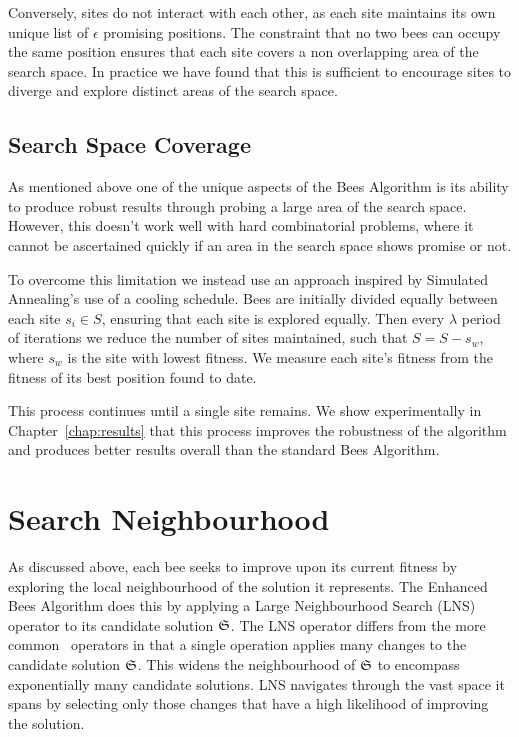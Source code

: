 Conversely, sites do not interact with each other, as each site maintains its own unique list of $\epsilon$ promising positions. The constraint that no two bees can occupy the same position ensures that each site covers a non overlapping area of the search space. In practice we have found that this is sufficient to encourage sites to diverge and explore distinct areas of the search space.    


\subsection{Search Space Coverage}
\label{subsec:searchspacecoverage}

As mentioned above one of the unique aspects of the Bees Algorithm is its ability to produce robust results through probing a large area of the search space. However, this doesn't work well with hard combinatorial problems, where it cannot be ascertained quickly if an area in the search space shows promise or not. 

To overcome this limitation we instead use an approach inspired by Simulated Annealing's use of a cooling schedule. Bees are initially divided equally between each site $s_i \in S$, ensuring that each site is explored equally. Then every $\lambda$ period of iterations we reduce the number of sites maintained, such that $S = S - s_w$, where $s_w$ is the site with lowest fitness. We measure each site's fitness from the fitness of its best position found to date.

This process continues until a single site remains. We show experimentally in Chapter~\ref{chap:results} that this process improves the robustness of the algorithm and produces better results overall than the standard Bees Algorithm. 

\section{Search Neighbourhood}
\label{sec:searchneighbourhood}

As discussed above, each bee seeks to improve upon its current fitness by exploring the local neighbourhood of the solution it represents. The Enhanced Bees Algorithm does this by applying a Large Neighbourhood Search (LNS) operator to its candidate solution $\mathfrak{S}$. The LNS operator differs from the more common \VRP\ operators in that a single operation applies many changes to the candidate solution $\mathfrak{S}$. This widens the neighbourhood of $\mathfrak{S}$ to encompass exponentially many candidate solutions. LNS navigates through the vast space it spans by selecting only those changes that have a high likelihood of improving the solution.

